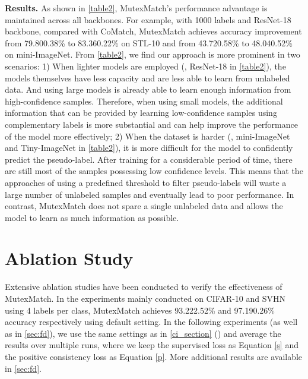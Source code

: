 \documentclass[lettersize,journal]{IEEEtran}
\theoremstyle{plain}
\theoremstyle{definition}
\theoremstyle{remark}
\begin{document}
\noindent\textbf{Results.} As shown in \cref{table2}, MutexMatch's performance advantage is maintained across all backbones.
For example, with 1000 labels and ResNet-18 backbone, compared with CoMatch, MutexMatch achieves accuracy improvement from 79.800.38\% to 83.360.22\% on STL-10 and from 43.720.58\% to 48.040.52\% on mini-ImageNet. 
From \cref{table2}, we find our approach is more prominent in two scenarios:
1) When lighter models are employed (\eg, ResNet-18 in \cref{table2}), the models themselves have less capacity and are less able to learn from unlabeled data. And using large models is already able to learn enough information from high-confidence samples. Therefore, when using small models, the additional information that can be provided by learning low-confidence samples using complementary labels is more substantial and can help improve the performance of the model more effectively; 2) When the dataset is harder (\eg, mini-ImageNet and Tiny-ImageNet in \cref{table2}), it is more difficult for the model to confidently predict the pseudo-label. After training for a considerable period of time, there are still most of the samples possessing low confidence levels. This means that the approaches of using a predefined threshold to filter pseudo-labels will waste a large number of unlabeled samples and eventually lead to poor performance. In contrast, MutexMatch does not spare a single unlabeled data and allows the model to learn as much information as possible.

\section{Ablation Study}
\newcommand{\mz}{5.5cm}
\label{ab_section}
Extensive ablation studies have been conducted to verify the effectiveness of MutexMatch. 
In the experiments mainly conducted on CIFAR-10 and SVHN using 4 labels per class, MutexMatch achieves 93.222.52\% and 97.190.26\% accuracy respectively using default setting. In the following experiments (as well as in \cref{sec:fd}), we use the same settings as in \cref{ci_section} () and average the results over multiple runs, where we keep the supervised loss as Equation \eqref{s} and the positive consistency loss as Equation \eqref{p}.
More additional results are available in \cref{sec:fd}.
\end{document}
